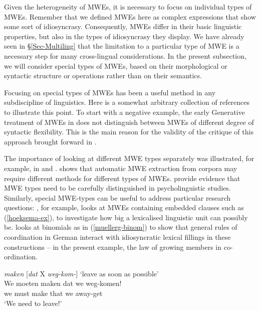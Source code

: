 \documentclass[output=paper]{langsci/langscibook}
\begin{document}
Given the heterogeneity of MWEs, it is necessary to focus on individual types of MWEs. Remember that we defined MWEs here as complex expressions that show some sort of idiosyncrasy. Consequently, MWEs differ in their basic linguistic properties, but also in the types of idiosyncrasy they display. We have already seen in §\ref{Sec-Multiling} that the limitation to a particular type of MWE is a necessary step for many cross-lingual considerations. In the present subsection, we will consider special types of MWEs, based on their morphological or syntactic structure or operations rather than on their semantics.

Focusing on special types of MWEs has been a useful method in any subdiscipline of linguistics. 
Here is a somewhat arbitrary collection of references to illustrate this point. 
To start with a negative example, the early Generative treatment of MWEs in \cite{Chomsky1957} does not distinguish between MWEs of different degree of  syntactic flexibility. This is the main reason for the validity of the critique of this approach brought forward in \cite{Chafe:68}.


The importance of looking at different MWE types separately was illustrated, for example, in \citet{Krenn:99} and \citet{Gibbs1989a}. 
\citet{Krenn:99} shows that automatic MWE extraction from corpora may require different methods for different types of MWEs. 
\citet{Gibbs1989a} provide evidence that MWE types need to be carefully distinguished in psycholinguistic studies. Similarly, special MWE-types can be useful to address particular research questions: 
\citet{Hoeksema:10idiom}, for example, looks at MWEs containing embedded clauses such as (\ref{hoeksema-ex}), to investigate how big a lexicalised linguistic unit can possibly be. 
\cite{MuellerG:98} looks at binomials as in (\ref{muellerg-binom}) to show that general rules of coordination in German interact with idiosyncratic lexical fillings in these constructions -- in the present example, the law of growing members in co-ordination.

 \ea
\label{hoeksema-ex}
\settowidth {} 
\textit{maken} [\textit{dat} X \textit{weg-kom-}] ‘leave as soon as possible’ \\ 
\gll We moeten maken dat we weg-komen!\\
we must make that we away-get\\  
\glt‘We need to leave!’
\z
\end{document}
